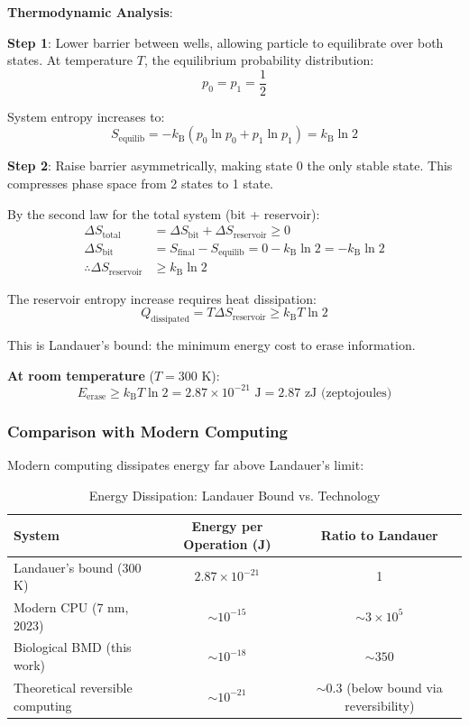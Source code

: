 \documentclass[11pt,a4paper]{article}
\newcommand{\kB}{k_\text{B}}
\begin{document}
\textbf{Thermodynamic Analysis}:

\textbf{Step 1}: Lower barrier between wells, allowing particle to equilibrate over both states. At temperature $T$, the equilibrium probability distribution:
\begin{equation}
p_0 = p_1 = \frac{1}{2}
\end{equation}

System entropy increases to:
\begin{equation}
S_{\text{equilib}} = -\kB(p_0 \ln p_0 + p_1 \ln p_1) = \kB \ln 2
\end{equation}

\textbf{Step 2}: Raise barrier asymmetrically, making state 0 the only stable state. This compresses phase space from 2 states to 1 state.

By the second law for the total system (bit + reservoir):
\begin{align}
\Delta S_{\text{total}} &= \Delta S_{\text{bit}} + \Delta S_{\text{reservoir}} \geq 0 \\
\Delta S_{\text{bit}} &= S_{\text{final}} - S_{\text{equilib}} = 0 - \kB \ln 2 = -\kB \ln 2 \\
\therefore \Delta S_{\text{reservoir}} &\geq \kB \ln 2
\end{align}

The reservoir entropy increase requires heat dissipation:
\begin{equation}
Q_{\text{dissipated}} = T \Delta S_{\text{reservoir}} \geq \kB T \ln 2
\end{equation}

This is Landauer's bound: the minimum energy cost to erase information.

\textbf{At room temperature} ($T = 300$ K):
\begin{equation}
E_{\text{erase}} \geq \kB T \ln 2 = 2.87 \times 10^{-21} \text{ J} = 2.87 \text{ zJ (zeptojoules)}
\end{equation}

\subsubsection{Comparison with Modern Computing}

Modern computing dissipates energy far above Landauer's limit:

\begin{table}[H]
\centering
\caption{Energy Dissipation: Landauer Bound vs. Technology}
\begin{tabular}{lcc}
\toprule
\textbf{System} & \textbf{Energy per Operation (J)} & \textbf{Ratio to Landauer} \\
\midrule
Landauer's bound (300 K) & $2.87 \times 10^{-21}$ & 1 \\
Modern CPU (7 nm, 2023) & $\sim 10^{-15}$ & $\sim 3 \times 10^5$ \\
Biological BMD (this work) & $\sim 10^{-18}$ & $\sim 350$ \\
Theoretical reversible computing & $\sim 10^{-21}$ & $\sim 0.3$ (below bound via reversibility) \\
\bottomrule
\end{tabular}
\end{table}
\end{document}
